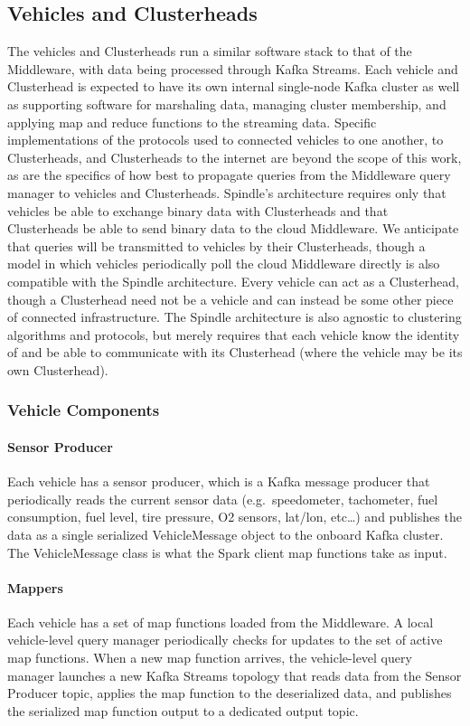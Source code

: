 \documentclass{thesis}
\begin{document}
\subsection{Vehicles and Clusterheads}
    The vehicles and Clusterheads run a similar software stack to that of the Middleware, with data being
    processed through Kafka Streams. Each vehicle and Clusterhead is expected to have its own internal
    single-node Kafka cluster as well as supporting software for marshaling data, managing cluster membership,
    and applying map and reduce functions to the streaming data.
    Specific implementations of the protocols used to connected vehicles to one another, to Clusterheads, and Clusterheads
    to the internet are beyond the scope of this work, as are the specifics of how best to propagate queries from the Middleware
    query manager to vehicles and Clusterheads. Spindle's architecture requires only that vehicles be able to exchange binary
    data with Clusterheads and that Clusterheads be able to send binary data to the cloud Middleware. We anticipate that queries
    will be transmitted to vehicles by their Clusterheads, though a model in which vehicles periodically poll the cloud Middleware
    directly is also compatible with the Spindle architecture.
    Every vehicle can act as a Clusterhead, though a Clusterhead need not be a vehicle and can instead be some other piece of
    connected infrastructure. The Spindle architecture is also agnostic to clustering algorithms and protocols, but merely requires
    that each vehicle know the identity of and be able to communicate with its Clusterhead (where the vehicle may be its own Clusterhead).
\subsubsection{Vehicle Components}
    \paragraph{Sensor Producer} 
        Each vehicle has a sensor producer, which is a Kafka message producer that periodically reads the current sensor data (e.g.\
        speedometer, tachometer, fuel consumption, fuel level, tire pressure, O2 sensors, lat/lon, etc\dots) and publishes the data
        as a single serialized VehicleMessage object to the onboard Kafka cluster. The VehicleMessage class is what the Spark client
        map functions take as input.
    \paragraph{Mappers}
        Each vehicle has a set of map functions loaded from the Middleware. A local vehicle-level query manager periodically checks
        for updates to the set of active map functions. When a new map function arrives, the vehicle-level query manager
        launches a new Kafka Streams topology that reads data from the Sensor Producer topic, applies the map function to the 
        deserialized data, and publishes the serialized map function output to a dedicated output topic.
\end{document}
